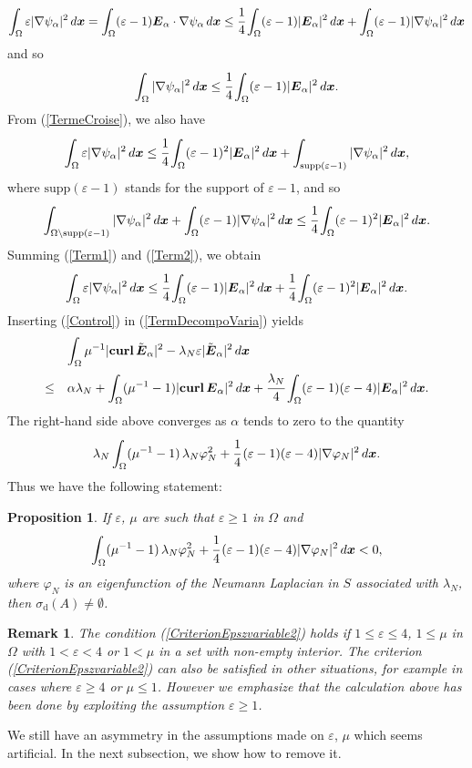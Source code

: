\documentclass[11pt,a4paper]{article}
\newcommand{\dsp}{\displaystyle}
\newcommand{\eps}{\varepsilon}
\newcommand{\Om}{\Omega}
\newcommand{\mrm}[1]{\mathrm{#1}}
\newcommand{\bfx}{\boldsymbol{x}}
\newcommand{\curlvec}{\boldsymbol{\mrm{curl}}\,}
\def\E{\boldsymbol{E}}
\newtheorem{remark}[theorem]{Remark}
\newtheorem{proposition}[theorem]{Proposition}
\begin{document}
\[
\int_\Om \eps|\nabla\psi_\alpha|^2\,d\bfx = \int_\Om(\eps-1)\E_\alpha\cdot\nabla\psi_\alpha\,d\bfx\le \cfrac{1}{4} \int_\Om(\eps-1)|\E_\alpha|^2\,d\bfx+\int_\Om (\eps-1)|\nabla\psi_\alpha|^2\,d\bfx
\]
and so 
\begin{equation}\label{Term1}
\int_\Om |\nabla\psi_\alpha|^2\,d\bfx\le \cfrac{1}{4} \int_\Om(\eps-1)|\E_\alpha|^2\,d\bfx.
\end{equation}
From (\ref{TermeCroise}), we also have
\[
\int_\Om \eps|\nabla\psi_\alpha|^2\,d\bfx\le \cfrac{1}{4} \int_\Om(\eps-1)^2|\E_\alpha|^2\,d\bfx+\int_{\mrm{supp}(\eps-1)}  |\nabla\psi_\alpha|^2\,d\bfx,
\]
where $\mrm{supp}(\eps-1)$ stands for the support of $\eps-1$, and so 
\begin{equation}\label{Term2}
\int_{\Om\setminus\mrm{supp}(\eps-1)} |\nabla\psi_\alpha|^2\,d\bfx+\int_{\Om} (\eps-1)|\nabla\psi_\alpha|^2\,d\bfx \le \cfrac{1}{4} \int_\Om(\eps-1)^2|\E_\alpha|^2\,d\bfx.
\end{equation}
Summing (\ref{Term1}) and (\ref{Term2}), we obtain
\begin{equation}\label{Control}
\int_\Om \eps|\nabla\psi_\alpha|^2\,d\bfx\le \cfrac{1}{4} \int_\Om(\eps-1)|\E_\alpha|^2\,d\bfx+\cfrac{1}{4} \int_\Om(\eps-1)^2|\E_\alpha|^2\,d\bfx.
\end{equation}
Inserting (\ref{Control}) in (\ref{TermDecompoVaria}) yields 
\[
\begin{array}{ll}
&\dsp\int_\Om \mu^{-1}|\curlvec\tilde{\E}_\alpha|^2-\lambda_N\eps|\tilde{\E}_\alpha|^2\,d\bfx  \\[10pt]
\le &\dsp\alpha\lambda_N+\int_\Om (\mu^{-1}-1)|\curlvec\E_\alpha|^2\,d\bfx+\cfrac{\lambda_N}{4}\dsp\int_\Om (\eps-1)(\eps-4)|\E_\alpha|^2\,d\bfx.
\end{array}
\]
The right-hand side above converges as $\alpha$ tends to zero to the quantity
\[ 
\lambda_N\int_{\Om}(\mu^{-1}-1)\,\lambda_N\varphi_N^2+\cfrac{1}{4}\,(\eps-1)(\eps-4)|\nabla\varphi_N|^2\,d\bfx.
\]
Thus we have the following statement:
\begin{proposition}
If $\eps$, $\mu$ are such that $\eps\ge1$ in $\Om$ and 
\begin{equation}\label{CriterionEpszvariable2}
\int_{\Om}(\mu^{-1}-1)\,\lambda_N\varphi_N^2+\cfrac{1}{4}\,(\eps-1)(\eps-4)|\nabla\varphi_N|^2\,d\bfx<0,
\end{equation}
where $\varphi_N$ is an eigenfunction of the Neumann Laplacian in $S$ associated with $\lambda_N$, then $\sigma_{\mrm{d}}(A)\ne\emptyset$. 
\end{proposition}
\begin{remark}
The condition (\ref{CriterionEpszvariable2}) holds if $1\le\eps\le4$, $1\le\mu $ in $\Om$ with $1<\eps<4$ or $1<\mu$ in a set with non-empty interior. The criterion (\ref{CriterionEpszvariable2}) can also be satisfied in other situations, for example in cases where $\eps\ge4$ or $\mu\le 1$. However we emphasize that the calculation above has been done by exploiting the assumption $\eps\ge1$. 
\end{remark}
\noindent We still have an asymmetry in the assumptions made on $\eps$, $\mu$ which seems artificial. In the next subsection, we show how to remove it.
\end{document}
